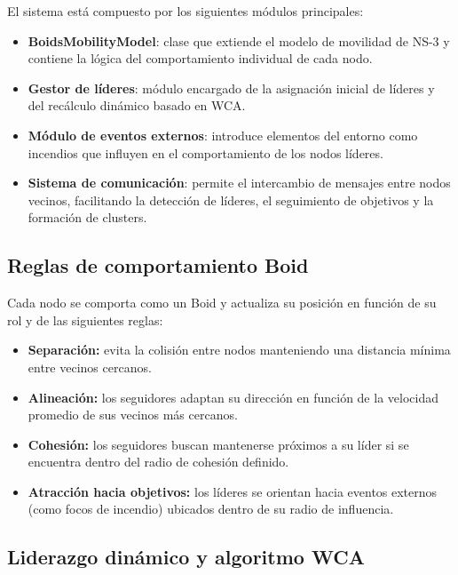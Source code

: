 \documentclass{article}
\begin{document}
El sistema está compuesto por los siguientes módulos principales:

\begin{itemize}
    \item \textbf{BoidsMobilityModel}: clase que extiende el modelo de movilidad de NS-3 y contiene la lógica del comportamiento individual de cada nodo.
    \item \textbf{Gestor de líderes}: módulo encargado de la asignación inicial de líderes y del recálculo dinámico basado en WCA.
    \item \textbf{Módulo de eventos externos}: introduce elementos del entorno como incendios que influyen en el comportamiento de los nodos líderes.
    \item \textbf{Sistema de comunicación}: permite el intercambio de mensajes entre nodos vecinos, facilitando la detección de líderes, el seguimiento de objetivos y la formación de clusters.
\end{itemize}

\subsection{Reglas de comportamiento Boid}

Cada nodo se comporta como un Boid y actualiza su posición en función de su rol y de las siguientes reglas:

\begin{itemize}
    \item \textbf{Separación:} evita la colisión entre nodos manteniendo una distancia mínima entre vecinos cercanos.

    \item \textbf{Alineación:} los seguidores adaptan su dirección en función de la velocidad promedio de sus vecinos más cercanos.

    \item \textbf{Cohesión:} los seguidores buscan mantenerse próximos a su líder si se encuentra dentro del radio de cohesión definido.

    \item \textbf{Atracción hacia objetivos:} los líderes se orientan hacia eventos externos (como focos de incendio) ubicados dentro de su radio de influencia.
\end{itemize}

\subsection{Liderazgo dinámico y algoritmo WCA}
\end{document}
